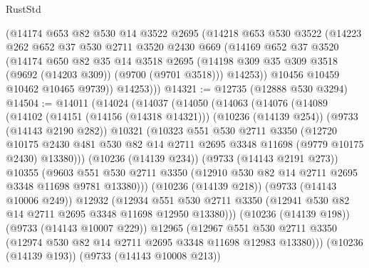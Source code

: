 \begin{lexlean}{RustStd}
\begin{coremodule}
        (@14174
          @653
          @82
          @530
          @14
          @3522
          @2695
          (@14218
            @653
            @530
            @3522
            (@14223
              @262
              @652
              @37
              @530
              @2711
              @3520
              @2430
              @669
              (@14169
                @652
                @37
                @3520
                (@14174
                  @650
                  @82
                  @35
                  @14
                  @3518
                  @2695
                  (@14198 @309 @35 @309 @3518 (@9692 (@14203 @309)) (@9700 (@9701 @3518)))
                  @14253))
              @10456
              @10459
              @10462
              @10465
              @9739))
          @14253)))
@14321 := @12735 (@12888 @530 @3294)
@14504 := @14011
    (@14024
      (@14037
        (@14050
          (@14063
            (@14076
              (@14089
                (@14102
                  (@14151 (@14156 (@14318 @14321)))
                  (@10236 (@14139 @254))
                  (@9733 (@14143 @2190 @282))
                  @10321
                  (@10323
                    @551
                    @530
                    @2711
                    @3350
                    (@12720
                      @10175
                      @2430
                      @481
                      @530
                      @82
                      @14
                      @2711
                      @2695
                      @3348
                      @11698
                      (@9779 @10175 @2430)
                      @13380)))
                (@10236 (@14139 @234))
                (@9733 (@14143 @2191 @273))
                @10355
                (@9603
                  @551
                  @530
                  @2711
                  @3350
                  (@12910 @530 @82 @14 @2711 @2695 @3348 @11698 @9781 @13380)))
              (@10236 (@14139 @218))
              (@9733 (@14143 @10006 @249))
              @12932
              (@12934
                @551
                @530
                @2711
                @3350
                (@12941 @530 @82 @14 @2711 @2695 @3348 @11698 @12950 @13380)))
            (@10236 (@14139 @198))
            (@9733 (@14143 @10007 @229))
            @12965
            (@12967
              @551
              @530
              @2711
              @3350
              (@12974 @530 @82 @14 @2711 @2695 @3348 @11698 @12983 @13380)))
          (@10236 (@14139 @193))
          (@9733 (@14143 @10008 @213))

\end{coremodule}
\end{lexlean}
